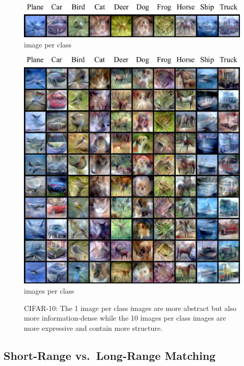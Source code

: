 \begin{figure}
    \centering
    \vspace{-6pt}
    \includegraphics[width=0.88\linewidth]{figures/CIFAR10_1_ipc.pdf}\\[-0.6ex]
    { image per class} \vspace{0.5cm}\\
        \vspace{-0.34cm}

    \includegraphics[width=0.88\linewidth, trim=0 0 0 20, clip]{figures/CIFAR10.pdf}\\[-0.6ex]
    { images per class}
         \vspace{-7pt}
    \caption{CIFAR-10: The 1 image per class images are more abstract but also more information-dense while the 10 images per class images are more expressive and contain more structure.}
         \vspace{-7pt}
\end{figure}


\subsection{Short-Range vs.~Long-Range Matching}

